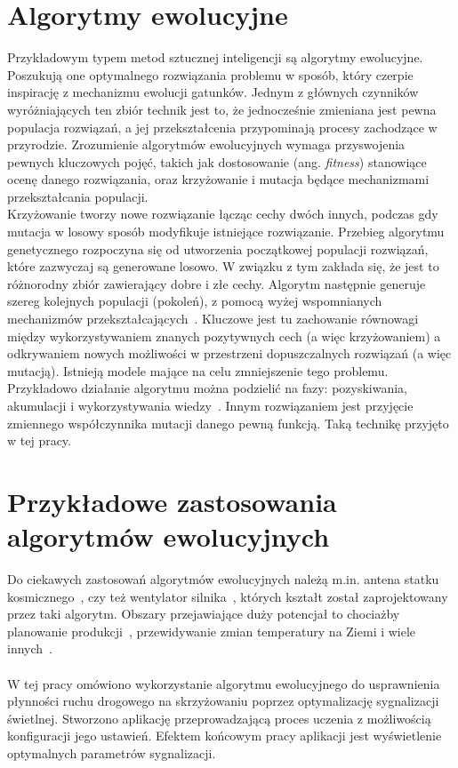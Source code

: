 \section*{Algorytmy ewolucyjne} Przykładowym typem metod sztucznej inteligencji są algorytmy ewolucyjne. Poszukują one optymalnego rozwiązania problemu w sposób, który czerpie inspirację z mechanizmu ewolucji gatunków. Jednym z głównych czynników wyróżniających ten zbiór technik jest to, że jednocześnie zmieniana jest pewna populacja rozwiązań, a jej przekształcenia przypominają procesy zachodzące w przyrodzie. Zrozumienie algorytmów ewolucyjnych wymaga przyswojenia pewnych kluczowych pojęć, takich jak dostosowanie (ang. \textit{fitness}) stanowiące ocenę danego rozwiązania, oraz krzyżowanie i mutacja będące mechanizmami przekształcania populacji. \\Krzyżowanie tworzy nowe rozwiązanie łącząc cechy dwóch innych, podczas gdy mutacja w losowy sposób modyfikuje istniejące rozwiązanie. 
Przebieg algorytmu genetycznego rozpoczyna się od utworzenia początkowej populacji rozwiązań, które zazwyczaj są generowane losowo. W związku z tym zakłada się, że jest to różnorodny zbiór zawierający dobre i złe cechy.
Algorytm następnie generuje szereg kolejnych populacji (pokoleń), z pomocą wyżej wspomnianych mechanizmów przekształcających~\cite{Cohoon:2003:EAP:903758.903786}. Kluczowe jest tu zachowanie równowagi między wykorzystywaniem znanych pozytywnych cech (a więc krzyżowaniem) a odkrywaniem nowych możliwości w przestrzeni dopuszczalnych rozwiązań (a więc mutacją). Istnieją modele mające na celu zmniejszenie tego problemu. Przykładowo działanie algorytmu można podzielić na fazy: pozyskiwania, akumulacji i wykorzystywania wiedzy~\cite{10.1371/journal.pone.0095693}. Innym rozwiązaniem jest przyjęcie zmiennego współczynnika mutacji danego pewną funkcją. Taką technikę przyjęto w tej pracy. 
\section*{Przykładowe zastosowania algorytmów ewolucyjnych} Do ciekawych zastosowań algorytmów ewolucyjnych należą m.in. antena statku kosmicznego~\cite{Lohn2006AutomatedAD}, czy też wentylator silnika~\cite{article}, których kształt został zaprojektowany przez taki algorytm. Obszary przejawiające duży potencjał to chociażby planowanie produkcji~\cite{Wall:1996:GAR:925320}, przewidywanie zmian temperatury na Ziemi\cite{Stanislawska:2012:MGT:2400749.2401077} i wiele innych~\cite{Steinbuch2010}.
\paragraph{}W tej pracy omówiono wykorzystanie algorytmu ewolucyjnego do usprawnienia płynności ruchu drogowego na skrzyżowaniu poprzez optymalizację sygnalizacji świetlnej. Stworzono aplikację przeprowadzającą proces uczenia z możliwością konfiguracji jego ustawień. Efektem końcowym pracy aplikacji jest wyświetlenie optymalnych parametrów sygnalizacji.
